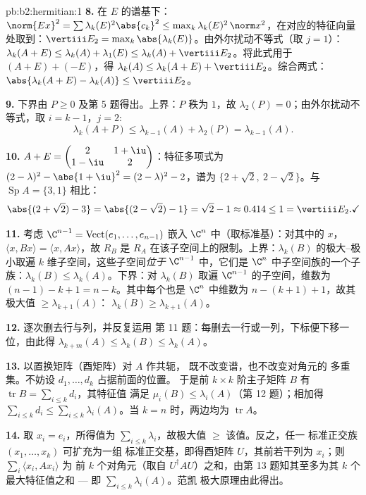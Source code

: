 \begin{solution}{pb:b2:hermitian:1}
\textbf{8.} 在 $E$ 的谱基下：$\norm{Ex}^2 = \sum
\lambda_k(E)^2\abs{c_k}^2 \leq \max_k\lambda_k(E)^2\,\norm
x^2$，在对应的特征向量处取到：$\vertiii E_2
= \max_k\abs{\lambda_k(E)}$。由外尔扰动不等式（取 $j = 1$）：$\lambda_k(A+E)
\leq \lambda_k(A) + \lambda_1(E) \leq \lambda_k(A) + \vertiii
E_2$。将此式用于 $(A+E) + (-E)$，得 $\lambda_k(A) \leq
\lambda_k(A+E) + \vertiii E_2$。综合两式：
$\abs{\lambda_k(A+E) - \lambda_k(A)} \leq \vertiii E_2$。

\textbf{9.} 下界由 $P \geq 0$ 及第 5 题得出。上界：$P$
秩为 $1$，故 $\lambda_2(P) = 0$；由外尔扰动不等式，取 $i = k-1$，$j =
2$:
\[
\lambda_k(A + P) \leq \lambda_{k-1}(A) + \lambda_2(P)
= \lambda_{k-1}(A) .
\]

\textbf{10.} $A + E = \begin{pmatrix} 2 & 1+\iu\\ 1-\iu &
2\end{pmatrix}$：特征多项式为 $(2-\lambda)^2 -
\abs{1+\iu}^2 = (2-\lambda)^2 - 2$，谱为 $\{2 + \sqrt2,\ 2
- \sqrt2\}$。与 $\operatorname{Sp}A = \{3, 1\}$ 相比：
\[
\abs{(2+\sqrt2) - 3} = \abs{(2-\sqrt2) - 1} = \sqrt2 - 1
\approx 0.414 \leq 1 = \vertiii E_2 . \checkmark
\]

\textbf{11.} 考虑 $\C^{n-1} = \operatorname{Vect}(e_1, \dots,
e_{n-1})$ 嵌入 $\C^n$ 中（取标准基）：对其中的 $x$，
$\langle x, Bx\rangle = \langle x, Ax\rangle$，故 $R_B$ 是
$R_A$ 在该子空间上的限制。上界：$\lambda_k
(B)$ 的极大–极小取遍 $k$ 维子空间，这些子空间\emph{位于}
$\C^{n-1}$ 中，它们是 $\C^n$ 中子空间族的一个子族：$\lambda_k(B) \leq
\lambda_k(A)$。下界：对 $\lambda_k(B)$
取遍 $\C^{n-1}$ 的子空间，维数为 $(n-1)-k+1 =
n-k$。其中每个也是 $\C^n$ 中维数为 $n -
(k+1) + 1$，故其极大值 $\geq \lambda_{k+1}(A)$：
$\lambda_k(B) \geq \lambda_{k+1}(A)$。

\textbf{12.} 逐次删去行与列，并反复运用
第 11 题：每删去一行或一列，下标便下移一位，由此得
$\lambda_{k+m}(A) \leq \lambda_k(B) \leq \lambda_k(A)$。

\textbf{13.} 以置换矩阵（酉矩阵）对 $A$ 作共轭，
既不改变谱，也不改变对角元的
多重集。不妨设 $d_1, \dots, d_k$ 占据前面的位置。
于是前 $k\times k$ 阶主子矩阵 $B$ 有
$\operatorname{tr} B = \sum_{i\leq k}d_i$，其特征值
满足 $\mu_i(B) \leq \lambda_i(A)$（第 12 题）；相加得
$\sum_{i\leq k}d_i \leq \sum_{i\leq k}\lambda_i(A)$。当 $k =
n$ 时，两边均为 $\operatorname{tr} A$。

\textbf{14.} 取 $x_i = e_i$，所得值为
$\sum_{i\leq k}\lambda_i$，故极大值 $\geq$ 该值。反之，任一
标准正交族 $(x_1, \dots, x_k)$ 可扩充为一组
标准正交基，即得酉矩阵 $U$，其前若干列为
$x_i$；则 $\sum_i\langle x_i, Ax_i\rangle$ 为
前 $k$ 个对角元（取自 $U^\dagger AU$）之和，由第
13 题知其至多为其 $k$ 个最大特征值之和 ---
即 $\sum_{i\leq k}\lambda_i(A)$。范凯
极大原理由此得出。


\end{solution}
